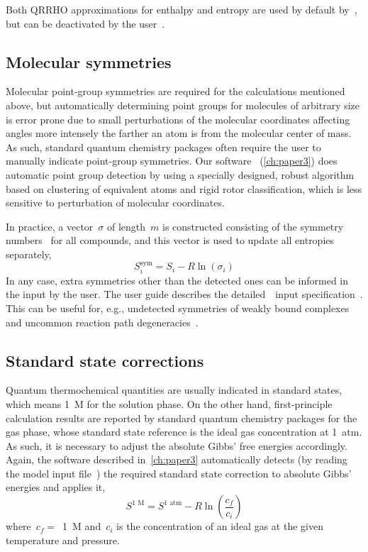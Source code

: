 % 
Both QRRHO approximations for enthalpy and entropy are used by default by~\overreact{},
but can be deactivated by the user~\cite{overreactguideinput2022}.

\subsection{Molecular symmetries}%
\label{sec:mol-sym}

Molecular point-group symmetries are required for the calculations mentioned above,
but automatically determining point groups for molecules of arbitrary size is error prone due
to small perturbations of the molecular coordinates affecting angles more intensely
the farther an atom is from the molecular center of mass.
As such,
standard quantum chemistry packages often require the user to manually indicate point-group symmetries.
Our software~\overreact{} (\cref{ch:paper3}) does automatic point group detection by using a specially designed,
robust algorithm
based on clustering of equivalent atoms and rigid rotor classification,
which is less sensitive to perturbation of molecular coordinates.

In practice,
a vector~$\sigma$ of length~$m$ is constructed consisting of the symmetry numbers~\cite{Fern_ndez_Ramos_2007,Gilson_2010}
for all compounds,
and this vector is used to update all entropies separately,
% 
\begin{equation}
	S_i^\text{sym}
	= S_i - R \ln{\left( \sigma_i \right)}
\end{equation}
% 
In any case,
extra symmetries other than the detected ones can be informed in the input by the user.
The user guide describes the detailed~\overreact{}~input specification~\cite{overreactguideinput2022}.
This can be useful for,
e.g.,
undetected symmetries of weakly bound complexes~\cite{Gilson_2010}
and uncommon reaction path degeneracies~\cite{Fern_ndez_Ramos_2007}.

\subsection{Standard state corrections}

Quantum thermochemical quantities are usually indicated in standard states,
which means 1~M for the solution phase.
On the other hand,
first-principle calculation results are reported
by standard quantum chemistry packages for the gas phase,
whose standard state reference is the ideal gas concentration at 1~atm.
As such,
it is necessary to adjust the absolute Gibbs' free energies accordingly.
Again,
the software described in~\cref{ch:paper3} automatically detects
(by reading the model input file~\cite{overreactguideinput2022})
the required standard state correction to absolute Gibbs' energies
and applies it,
% 
\begin{equation}
	S^\text{1~M} = S^\text{1~atm}
	- R \ln{\left( \frac{c_f}{c_i} \right)}
\end{equation}
% 
where~$c_f =$~1~M and~$c_i$ is the concentration of an ideal gas at the given temperature and pressure.

